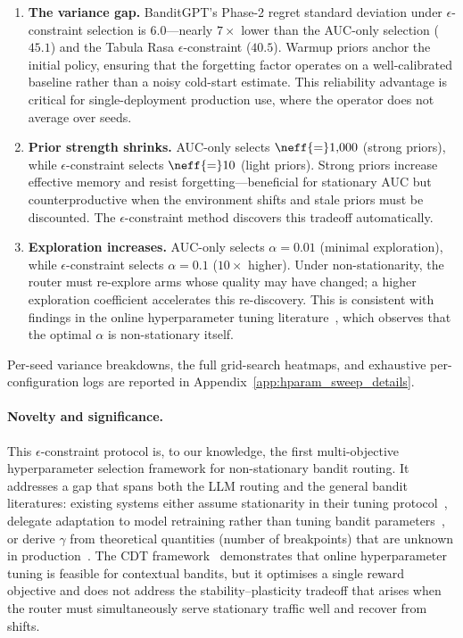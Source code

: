 \begin{enumerate}[nosep,leftmargin=*]
  \item \textbf{The variance gap.}
    BanditGPT's Phase-2 regret standard deviation under
    $\epsilon$-constraint selection is $6.0$---nearly $7\times$ lower
    than the AUC-only selection ($45.1$) and the Tabula Rasa
    $\epsilon$-constraint ($40.5$).
    Warmup priors anchor the initial policy, ensuring that the
    forgetting factor operates on a well-calibrated baseline rather
    than a noisy cold-start estimate.
    This reliability advantage is critical for single-deployment
    production use, where the operator does not average over seeds.

  \item \textbf{Prior strength shrinks.}
    AUC-only selects $\neff{=}1{,}000$ (strong priors), while
    $\epsilon$-constraint selects $\neff{=}10$ (light priors).
    Strong priors increase effective memory and
    resist forgetting---beneficial for stationary AUC but
    counterproductive when the environment shifts and stale priors
    must be discounted.
    The $\epsilon$-constraint method discovers this tradeoff
    automatically.

  \item \textbf{Exploration increases.}
    AUC-only selects $\alpha{=}0.01$ (minimal exploration),
    while $\epsilon$-constraint selects $\alpha{=}0.1$
    ($10\times$ higher).
    Under non-stationarity, the router must re-explore arms whose
    quality may have changed; a higher exploration coefficient
    accelerates this re-discovery.
    This is consistent with findings in the online hyperparameter
    tuning literature~\cite{kang2024cdt}, which observes that the
    optimal $\alpha$ is non-stationary itself.
\end{enumerate}
%
\noindent
Per-seed variance breakdowns, the full grid-search heatmaps, and
exhaustive per-configuration logs are reported in
Appendix~\ref{app:hparam_sweep_details}.

\paragraph{Novelty and significance.}
This $\epsilon$-constraint protocol is, to our knowledge, the first
multi-objective hyperparameter selection framework for non-stationary
bandit routing.
It addresses a gap that spans both the LLM routing and the general
bandit literatures:
existing systems either assume stationarity in their tuning
protocol~\cite{panda2025pilot,wang2025barp,li2025llmbandit},
delegate adaptation to model retraining rather than tuning bandit
parameters~\cite{wang2025mixllm}, or derive $\gamma$ from
theoretical quantities (number of breakpoints) that are unknown in
production~\cite{garivier2011switching}.
The CDT framework~\cite{kang2024cdt} demonstrates that online
hyperparameter tuning is feasible for contextual bandits, but it
optimises a single reward objective and does not address the
stability--plasticity tradeoff that arises when the router must
simultaneously serve stationary traffic well and recover from shifts.


